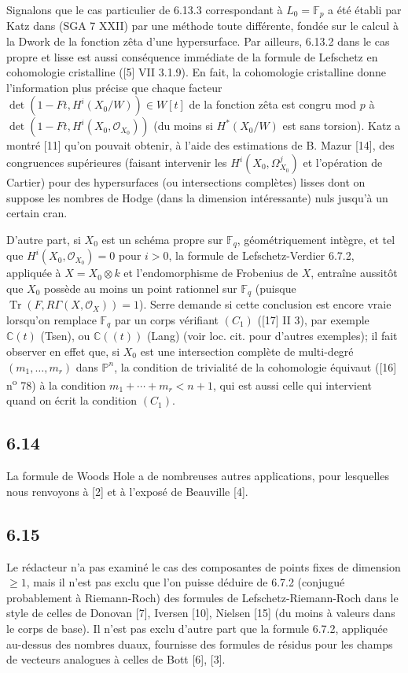 \documentclass[11pt]{article}
\providecommand{\OO}{\mathcal{O}}
\begin{document}
Signalons que le cas particulier de 6.13.3 correspondant à $L_0=\mathbb F_p$ a été établi par Katz dans (SGA 7 XXII) par une méthode toute différente, fondée sur le calcul à la Dwork de la fonction zêta d'une hypersurface. Par ailleurs, 6.13.2 dans le cas propre et lisse est aussi conséquence immédiate de la formule de Lefschetz en cohomologie cristalline ([5] VII 3.1.9). En fait, la cohomologie cristalline donne l'information plus précise que chaque facteur $\det(1-Ft,H^i(X_0/W))\in W[t]$ de la fonction zêta est congru mod $p$ à $\det(1-Ft,H^i(X_0,\OO_{X_0}))$ (du moins si $H^*(X_0/W)$ est sans torsion). Katz a montré [11] qu'on pouvait obtenir, à l'aide des estimations de B. Mazur [14], des congruences supérieures (faisant intervenir les $H^i(X_0,\Omega^j_{X_0})$ et l'opération de Cartier) pour des hypersurfaces (ou intersections complètes) lisses dont on suppose les nombres de Hodge (dans la dimension intéressante) nuls jusqu'à un certain cran.

D'autre part, si $X_0$ est un schéma propre sur $\mathbb F_q$, géométriquement intègre, et tel que $H^i(X_0,\OO_{X_0})=0$ pour $i>0$, la formule de Lefschetz-Verdier 6.7.2, appliquée à $X=X_0\otimes k$ et l'endomorphisme de Frobenius de $X$, entraîne aussitôt que $X_0$ possède au moins un point rationnel sur $\mathbb F_q$ (puisque $\operatorname{Tr}(F,R\Gamma(X,\OO_X))=1$). Serre demande si cette conclusion est encore vraie lorsqu'on remplace $\mathbb F_q$ par un corps vérifiant $(C_1)$ ([17] II 3), par exemple $\mathbb C(t)$ (Tsen), ou $\mathbb C((t))$ (Lang) (voir loc. cit. pour d'autres exemples); il fait observer en effet que, si $X_0$ est une intersection complète de multi-degré $(m_1,\ldots,m_r)$ dans $\mathbb P^n$, la condition de trivialité de la cohomologie équivaut ([16] n\textsuperscript{o} 78) à la condition $m_1+\cdots+m_r<n+1$, qui est aussi celle qui intervient quand on écrit la condition $(C_1)$.

\subsection*{6.14}
La formule de Woods Hole a de nombreuses autres applications, pour lesquelles nous renvoyons à [2] et à l'exposé de Beauville [4].


\subsection*{6.15}

Le rédacteur n'a pas examiné le cas des composantes de points fixes de dimension $\geq1$, mais il n'est pas exclu que l'on puisse déduire de 6.7.2 (conjugué probablement à Riemann-Roch) des formules de Lefschetz-Riemann-Roch dans le style de celles de Donovan [7], Iversen [10], Nielsen [15] (du moins à valeurs dans le corps de base). Il n'est pas exclu d'autre part que la formule 6.7.2, appliquée au-dessus des nombres duaux, fournisse des formules de résidus pour les champs de vecteurs analogues à celles de Bott [6], [3].
\end{document}
